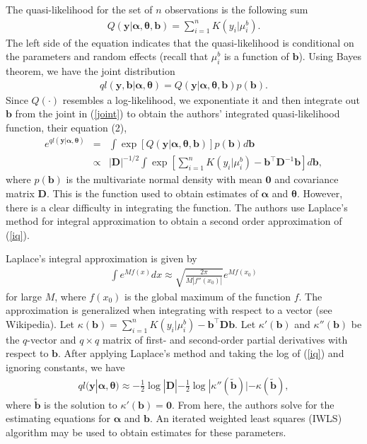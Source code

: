 \documentclass[12pt]{article}
\newcommand{\m}[1]{\mathbf{\bm{#1}}}
\begin{document}
The quasi-likelihood for the set of $n$ observations is the following sum
\begin{eqnarray}
Q(\m{y}|\m{\alpha}, \m{\theta}, \m{b}) = \sum_{i=1}^nK(y_i|\mu_i^b).
\end{eqnarray}
The left side of the equation indicates that the quasi-likelihood is conditional on the parameters and random effects (recall that $\mu_i^b$ is a function of $\m{b}$). Using Bayes theorem, we have the joint distribution
\begin{eqnarray}
ql(\m{y},\m{b}|\m{\alpha},\m{\theta}) = Q(\m{y}|\m{\alpha},\m{\theta},\m{b})p(\m{b}). \label{joint}
\end{eqnarray}
Since $Q(\cdot)$ resembles a log-likelihood, we exponentiate it and then integrate out $\m{b}$ from the joint in (\ref{joint}) to obtain the authors' integrated quasi-likelihood function, their equation (2),
\begin{eqnarray}
e^{ql(\m{y}|\m{\alpha},\m{\theta})} &=& \int\exp\left[Q(\m{y}|\m{\alpha},\m{\theta},\m{b})\right]p(\m{b})d\m{b} \\
&\propto& |\m{D}|^{-1/2}\int\exp\left[\sum_{i=1}^nK(y_i|\mu_i^b)-\m{b}^\top\m{D}^{-1}\m{b}\right]d\m{b}, \label{iq}
\end{eqnarray}
where $p(\m{b})$ is the multivariate normal density with mean $\m{0}$ and covariance matrix $\m{D}$. This is the function used to obtain estimates of $\m{\alpha}$ and $\m{\theta}$. However, there is a clear difficulty in integrating the function. The authors use Laplace's method for integral approximation to obtain a second order approximation of (\ref{iq}).

Laplace's integral approximation is given by
\begin{eqnarray}
\int e^{Mf(x)}dx \approx \sqrt{\frac{2\pi}{M|f''(x_0)|}} e^{Mf(x_0)}
\end{eqnarray}
for large $M$, where $f(x_0)$ is the global maximum of the function $f$. The approximation is generalized when integrating with respect to a vector (see Wikipedia). Let $\kappa(\m{b})=\sum_{i=1}^nK(y_i|\mu_i^b)-\m{b}^\top\m{D}\m{b}$. Let $\kappa'(\m{b})$ and $\kappa''(\m{b})$ be the $q$-vector and $q\times q$ matrix of first- and second-order partial derivatives with respect to $\m{b}$. After applying Laplace's method and taking the log of (\ref{iq}) and ignoring constants, we have
\begin{eqnarray}
ql(\m{y}|\m{\alpha},\m{\theta}) \approx -\frac{1}{2}\log|\m{D}| -\frac{1}{2}\log|\kappa''(\tilde{\m{b}})| - \kappa(\tilde{\m{b}}),
\end{eqnarray}
where $\tilde{\m{b}}$ is the solution to $\kappa'(\m{b})=\m{0}$. From here, the authors solve for the estimating equations for $\m{\alpha}$ and $\m{b}$. An iterated weighted least squares (IWLS) algorithm may be used to obtain estimates for these parameters.
\end{document}
